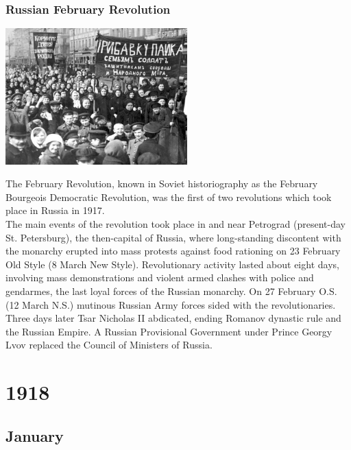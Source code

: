 \documentclass[11pt]{report}
\begin{document}
\subsection{Russian February Revolution}
\vspace{2mm}\begin{center}\includegraphics[width=7cm]{./img/febRusRev.jpg}\end{center}
The February Revolution, known in Soviet historiography as the February Bourgeois Democratic Revolution, was the first of two revolutions which took place in Russia in 1917.\\
The main events of the revolution took place in and near Petrograd (present-day St. Petersburg), the then-capital of Russia, where long-standing discontent with the monarchy erupted into mass protests against food rationing on 23 February Old Style (8 March New Style). Revolutionary activity lasted about eight days, involving mass demonstrations and violent armed clashes with police and gendarmes, the last loyal forces of the Russian monarchy. On 27 February O.S. (12 March N.S.) mutinous Russian Army forces sided with the revolutionaries. Three days later Tsar Nicholas II abdicated, ending Romanov dynastic rule and the Russian Empire. A Russian Provisional Government under Prince Georgy Lvov replaced the Council of Ministers of Russia.

\chapter{1918}
\section{January}
\end{document}

